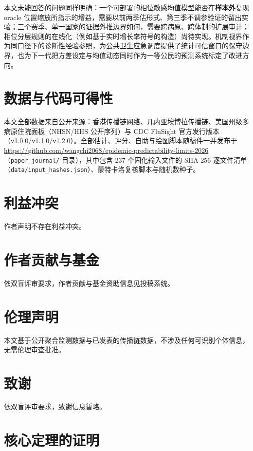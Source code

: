 \documentclass[10pt,UTF8,a4paper,zihao=-4]{ctexart}
\theoremstyle{plain}
\theoremstyle{definition}
\theoremstyle{remark}
\begin{document}
本文未能回答的问题同样明确：一个可部署的相位敏感均值模型能否在\textbf{样本外}复现 oracle 位置缩放所指示的增益，需要以前两季估形式、第三季不调参验证的留出实验；三个赛季、单一国家的证据外推边界如何，需要跨病原、跨体制的扩展审计；相位分层规则的在线化（例如基于实时增长率符号的构造）尚待实现。机制视界作为同口径下的诊断性经验参照，为公共卫生应急调度提供了统计可信窗口的保守边界，也为下一代把方差设定与均值动态同时作为一等公民的预测系统标定了改进方向。

\section*{数据与代码可得性}

本文全部数据来自公开来源：香港传播链网络\citep{adam2020clustering}、几内亚埃博拉传播链\citep{faye2015chains}、美国州级多病原住院面板（NHSN/HHS 公开序列）与 CDC FluSight 官方发行版本（v1.0.0/v1.1.0/v1.2.0）。全部估计、评分、自助与绘图脚本随稿件一并发布于 \url{https://github.com/wangchi2068/epidemic-predictability-limits-2026}（\texttt{paper\_journal/} 目录），其中包含 237 个固化输入文件的 SHA-256 逐文件清单（\texttt{data/input\_hashes.json}）、蒙特卡洛复核脚本与随机数种子。

\section*{利益冲突}

作者声明不存在利益冲突。

\section*{作者贡献与基金}

依双盲评审要求，作者贡献与基金资助信息见投稿系统。

\section*{伦理声明}

本文基于公开聚合监测数据与已发表的传播链数据，不涉及任何可识别个体信息，无需伦理审查批准。

\section*{致谢}

依双盲评审要求，致谢信息暂略。

\clearpage
\appendix
\renewcommand{\thesection}{A}
\section{核心定理的证明}\label{app:proofs}
\end{document}
